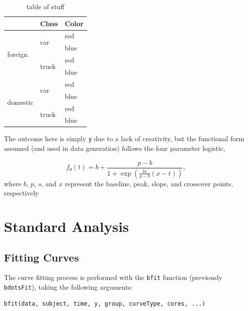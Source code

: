 \documentclass{article}
\newcommand{\xt}{\texttt}%
\begin{document}
\begin{table}[h]
\centering
\def\arraystretch{1.5}
\begin{tabular}{|p{0.9in}|p{0.9in}|p{0.9in}|} \hline 
\rowcolor{lightgray} \multicolumn{1}{|c|}{Origin} & \multicolumn{1}{c|}{Class} & \multicolumn{1}{c|}{Color}\\
\hline
\multirow{4}{*}{foreign} & \multirow{2}{*}{car} & red \\
\hhline{~~-}
& & blue \\
\hhline{~--}
& \multirow{2}{*}{truck} & red \\
\hhline{~~-}
& & blue \\
\hline
\multirow{4}{*}{domestic} & \multirow{2}{*}{car} & red \\
\hhline{~~-}
& & blue \\
\hhline{~--}
& \multirow{2}{*}{truck} & red \\
\hhline{~~-}
& & blue \\
\hline
\end{tabular}
\caption{table of stuff}
\label{tab:group_table1}
\end{table}

The outcome here is simply \xt{y} due to a lack of creativity, but the functional form assumed (and used in data generation) follows the four parameter logistic, 

\begin{equation}
f_{\theta}(t) = b + \frac{p-b}{1 + \exp \left( \frac{4s}{p-b} (x-t) \right)},
\end{equation}
where $b$, $p$, $s$, and $x$ represent the baseline, peak, slope, and crossover points, respectively


\section{Standard Analysis}


\subsection{Fitting Curves}

The curve fitting process is performed with the \texttt{bfit} function (previously \texttt{bdotsFit}), taking the following arguments:

\begin{center}
\begin{verbatim}
bfit(data, subject, time, y, group, curveType, cores, ...)
\end{verbatim}
\end{center}
\end{document}

